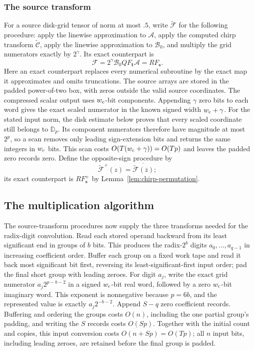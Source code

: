 \documentclass[11pt]{article}
\theoremstyle{definition}
\begin{document}
\subsubsection{The source transform}

For a source disk-grid tensor of norm at most $.5$, write
$\widetilde{\mathscr F}$ for the following procedure: apply the linewise
approximation to $\mathcal A$, apply the
computed chirp transform $\widetilde{\mathscr C}$, apply the linewise
approximation to $\mathcal B_0$, and multiply the grid numerators
exactly by $2^\gamma$.  Its exact counterpart is
\[
 \mathscr F=2^\gamma\mathcal B_0QF_{\boldsymbol t}\mathcal A
            =RF_{\boldsymbol s}.
\]
Here an exact counterpart replaces every numerical subroutine by the
exact map it approximates and omits truncations.  The source arrays are
stored in the padded power-of-two box, with zeros outside the valid
source coordinates.
The compressed scalar output uses $w_{\rm c}$-bit components. Appending
$\gamma$ zero bits to each word gives the exact scaled numerator in the
known signed width $w_{\rm c}+\gamma$. For the stated input norm, the
disk estimate below proves that every scaled coordinate still belongs to
$\mathbb D_p$. Its component numerators therefore have magnitude at most
$2^p$, so a scan removes only leading sign-extension bits and returns
the same integers in $w_{\rm c}$ bits. This scan costs
$O(T(w_{\rm c}+\gamma))=O(Tp)$ and leaves the padded zero records zero.
Define the opposite-sign procedure by
\[
 \widetilde{\mathscr F}^{+}(z)
   =\overline{\widetilde{\mathscr F}(\overline z)};
\]
its exact counterpart is $RF_{\boldsymbol s}^{+}$ by
Lemma~\ref{lem:chirp-permutation}.

\subsection{The multiplication algorithm}

The source-transform procedures now supply the three transforms needed
for the radix-digit convolution. Read each stored operand backward from
its least significant end in groups of $b$ bits. This produces the radix-$2^b$ digits
$a_0,\ldots,a_{q-1}$ in increasing coefficient order.  Buffer each
group on a fixed work tape and read it back most significant bit first,
reversing its least-significant-first input order; pad the final short
group with leading zeroes.
For digit $a_j$, write the exact grid numerator
$a_j2^{p-b-2}$ in a signed $w_{\rm c}$-bit real word, followed by a zero
$w_{\rm c}$-bit imaginary word. This exponent is nonnegative
because $p=6b$, and the represented value is exactly $a_j2^{-b-2}$.
Append $S-q$ zero coefficient records.  Buffering and ordering the
groups costs $O(n)$, including the one partial group's padding, and
writing the $S$ records costs $O(Sp)$.
Together with the initial count and copies, this input conversion
costs $O(n+Sp)=O(Tp)$; all $n$ input bits, including leading zeroes,
are retained before the final group is padded.
\end{document}
